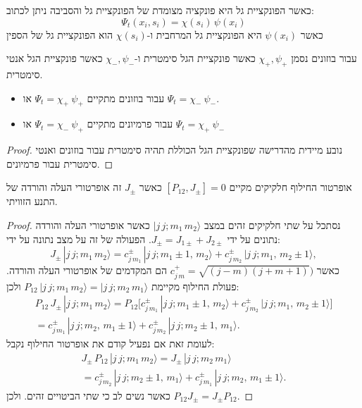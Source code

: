 \documentclass{tstextbook}
\begin{document}
\begin{symbolize}
כאשר הפונקציית גל היא פונקציה מצומדת של הפונקציית גל והסביבה ניתן לכתוב:
$$\Psi_{t}(x_{i},s_{i})=\chi(s_{i})\,\psi(x_{i})$$
כאשר \(\psi(x_{i})\) היא הפונקציית גל המרחבית ו-\(\chi(s_{i})\) הוא הפונקציית גל של הספין

\end{symbolize}
\begin{symbolize}
עבור בוזונים נסמן \(\chi_{+},\psi_{+}\) כאשר פונקציית הגל סימטרית ו-\(\chi_{-},\psi_{-}\) כאשר פונקציית הגל אנטי סימטרית.

\end{symbolize}
\begin{proposition}
  \begin{itemize}
    \item עבור בוזונים מתקיים \(\Psi_{t}=\chi_{+}\ \psi_{+}\) או \(\Psi_{t}=\chi_{-}\ \psi_{-}\).
    \item עבור פרמיונים מתקיים \(\Psi_{t}=\chi_{-}\ \psi_{+}\) או \(\Psi_{t}=\chi_{+}\ \psi_{-}\)
  \end{itemize}
\end{proposition}
\begin{proof}
נובע מיידית מהדרישה שפונקציית הגל הכוללת תהיה סימטרית עבור בוזונים ואנטי סימטרית עבור פרמיונים.

\end{proof}
\begin{proposition}[אינווריאנטיות של \(P_{12}\) עם \(J_{\pm}\)]
אופרטור החילוף חלקיקים מקיים \(\left[ P_{12},J_{\pm} \right]=0\) כאשר \(J_{\pm}\) זה אופרטורי העלה והורדה של התנע הזוויתי.

\end{proposition}
\begin{proof}
נסתכל על שתי חלקיקים זהים במצב \(|j\,j;m_{1}\,m_{2}\rangle\) כאשר אופרטורי העלה והורדה נתונים על ידי \(J_{\pm}=J_{1\pm}+J_{2\pm}\). הפעולה של זה על מצב נתונה על ידי:
$$J_{\pm}\,|j\,j;m_{1}\,m_{2}\rangle=c_{j\,m_{1}}^{\pm}\,|j\,j;m_{1}\pm1,\,m_{2}\rangle+c_{j\,m_{2}}^{\pm}\,|j\,j;m_{1},\,m_{2}\pm1\rangle,$$
כאשר \(c_{j\,m}^{+}=\sqrt{(j-m)(j+m+1)})\) הם המקדמים של אופרטורי העלה והורדה. פעולת החילוף מקיימת \(P_{12}\,|j\,j;m_{1}\,m_{2}\rangle=|j\,j;m_{2}\,m_{1}\rangle\) ולכן:
$$\begin{array}{c}{{P_{12}\,J_{\pm}\,|j\,j;m_{1}\,m_{2}\rangle=P_{12}\Big[c_{j\,m_{1}}^{\pm}\,|j\,j;m_{1}\pm1,\,m_{2}\rangle+c_{j\,m_{2}}^{\pm}\,|j\,j;m_{1},\,m_{2}\pm1\rangle\Big]}}\\ {{=c_{j\,m_{1}}^{\pm}\,|j\,j;m_{2},\,m_{1}\pm1\rangle+c_{j\,m_{2}}^{\pm}\,|j\,j;m_{2}\pm1,\,m_{1}\rangle.}}\end{array}$$
לעומת זאת אם נפעיל קודם את אופרטור החילוף נקבל:
$$\begin{array}{c}{{J_{\pm}\,P_{12}\,|j\,j;m_{1}\,m_{2}\rangle=J_{\pm}\,|j\,j;m_{2}\,m_{1}\rangle}}\\ {{=c_{j\,m_{2}}^{\pm}\,|j\,j;m_{2}\pm1,\,m_{1}\rangle+c_{j\,m_{1}}^{\pm}\,|j\,j;m_{2},\,m_{1}\pm1\rangle.}}\end{array}$$
כאשר נשים לב כי שתי הביטויים זהים. ולכן \(P_{12}J_{\pm}=J_{\pm}P_{12}\).

\end{proof}
\end{document}
